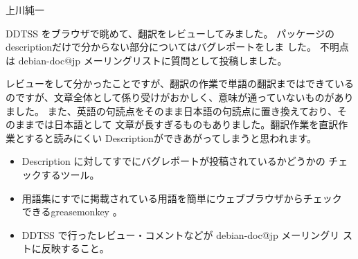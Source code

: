 
\begin{prework}{上川純一}


DDTSS をブラウザで眺めて、翻訳をレビューしてみました。
パッケージのdescriptionだけで分からない部分についてはバグレポートをしま
した。
不明点は debian-doc@jp メーリングリストに質問として投稿しました。


レビューをして分かったことですが、翻訳の作業で単語の翻訳まではできている
のですが、文章全体として係り受けがおかしく、意味が通っていないものがありました。
また、英語の句読点をそのまま日本語の句読点に置き換えており、そのままでは日本語として
文章が長すぎるものもありました。翻訳作業を直訳作業とすると読みにくい
Descriptionができあがってしまうと思われます。


\begin{itemize}
 \item Description に対してすでにバグレポートが投稿されているかどうかの
       チェックするツール。

 \item 用語集にすでに掲載されている用語を簡単にウェブブラウザからチェック
       できるgreasemonkey 。

 \item DDTSS で行ったレビュー・コメントなどが debian-doc@jp メーリングリ
       ストに反映すること。
\end{itemize}

\end{prework}

